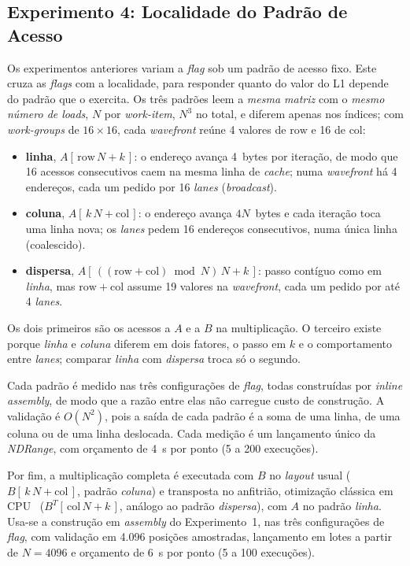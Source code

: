 \documentclass[12pt]{article}
\begin{document}
\subsection{Experimento 4: Localidade do Padrão de Acesso}
\label{sec:met-localidade}

Os experimentos anteriores variam a \textit{flag} sob um padrão de acesso fixo.
Este cruza as \textit{flags} com a localidade, para responder quanto do valor do
L1 depende do padrão que o exercita. Os três padrões leem a \emph{mesma matriz}
com o \emph{mesmo número de \textit{loads}}, $N$ por \textit{work-item}, $N^3$
no total, e diferem apenas nos índices; com \textit{work-groups} de $16\times16$,
cada \textit{wavefront} reúne 4 valores de $\mathrm{row}$ e 16 de $\mathrm{col}$:

\begin{itemize}\setlength{\itemsep}{0pt}\setlength{\parsep}{0pt}
\item \textbf{linha}, $A[\,\mathrm{row}\,N + k\,]$: o endereço avança 4~bytes por
iteração, de modo que 16 acessos consecutivos caem na mesma linha de
\textit{cache}; numa \textit{wavefront} há 4 endereços, cada um pedido por 16
\textit{lanes} (\textit{broadcast}).
\item \textbf{coluna}, $A[\,k\,N + \mathrm{col}\,]$: o endereço avança $4N$~bytes e
cada iteração toca uma linha nova; os \textit{lanes} pedem 16 endereços
consecutivos, numa única linha (coalescido).
\item \textbf{dispersa}, $A[\,((\mathrm{row}+\mathrm{col}) \bmod N)\,N + k\,]$:
passo contíguo como em \textit{linha}, mas $\mathrm{row}+\mathrm{col}$ assume 19
valores na \textit{wavefront}, cada um pedido por até 4 \textit{lanes}.
\end{itemize}

Os dois primeiros são os acessos a $A$ e a $B$ na multiplicação. O terceiro
existe porque \textit{linha} e \textit{coluna} diferem em dois fatores, o passo
em $k$ e o comportamento entre \textit{lanes}; comparar \textit{linha} com
\textit{dispersa} troca só o segundo.

Cada padrão é medido nas três configurações de \textit{flag}, todas construídas
por \textit{inline assembly}, de modo que a razão entre elas não carregue custo de
construção. A validação é $O(N^2)$, pois a saída de cada padrão é a soma de uma
linha, de uma coluna ou de uma linha deslocada. Cada medição é um lançamento
único da \textit{NDRange}, com orçamento de 4~s por ponto (5 a 200 execuções).

Por fim, a multiplicação completa é executada com $B$ no \textit{layout} usual
($B[\,k\,N+\mathrm{col}\,]$, padrão \textit{coluna}) e transposta no anfitrião,
otimização clássica em CPU~\cite{drepper2007} ($B^{T}[\,\mathrm{col}\,N+k\,]$,
análogo ao padrão \textit{dispersa}), com $A$ no padrão \textit{linha}. Usa-se a
construção em \textit{assembly} do Experimento~1, nas três configurações de
\textit{flag}, com validação em 4.096 posições amostradas, lançamento em lotes a partir de
$N=4096$ e orçamento de 6~s por ponto (5 a 100 execuções).
\end{document}
